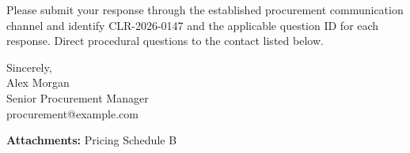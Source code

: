 \documentclass[
]{article}
\begin{document}
Please submit your response through the established procurement
communication channel and identify CLR-2026-0147 and the applicable
question ID for each response. Direct procedural questions to the
contact listed below.

Sincerely,\\
Alex Morgan\\
Senior Procurement Manager\\
procurement@example.com

\textbf{Attachments:} Pricing Schedule B
\end{document}
